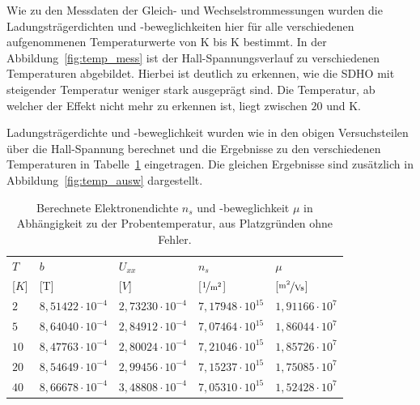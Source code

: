 
Wie zu den Messdaten der Gleich- und Wechselstrommessungen wurden die Ladungsträgerdichten und -beweglichkeiten hier für alle verschiedenen aufgenommenen Temperaturwerte von \unit[2]{K} bis \unit[40]{K} bestimmt. In der Abbildung~\ref{fig:temp_mess} ist der Hall-Spannungsverlauf zu verschiedenen Temperaturen abgebildet. Hierbei ist deutlich zu erkennen, wie die SDHO mit steigender Temperatur weniger stark ausgeprägt sind. Die Temperatur, ab welcher der Effekt nicht mehr zu erkennen ist, liegt zwischen $20$ und \unit[40]{K}.

Ladungsträgerdichte und -beweglichkeit wurden wie in den obigen Versuchsteilen über die Hall-Spannung berechnet und die Ergebnisse zu den verschiedenen Temperaturen in Tabelle~\ref{tab:temp_ausw} eingetragen. Die gleichen Ergebnisse sind zusätzlich in Abbildung~\ref{fig:temp_ausw} dargestellt.

\begin{table}[h]
	\centering
	\begin{tabular}{|l|r|l|r|r|}
		\hline
		\multicolumn{1}{|l|}{\cellcolor{black!30} $T$ } & \multicolumn{1}{|l|}{\cellcolor{black!30} $b$ } & \multicolumn{1}{|l|}{\cellcolor{black!30} $U_{xx}$ } & \multicolumn{1}{|l|}{\cellcolor{black!30} $n_s$ } & \multicolumn{1}{|l|}{\cellcolor{black!30} $\mu$ } \\
		\multicolumn{1}{|l|}{\cellcolor{black!30} [$\unit{K}$] } &  \multicolumn{1}{|l|}{\cellcolor{black!30} [\unit{T}] } &
		\multicolumn{1}{|l|}{\cellcolor{black!30} [$\unit{V}$] } &  \multicolumn{1}{|l|}{\cellcolor{black!30} [$\unitfrac{1}{m^2}$] } & \multicolumn{1}{|l|}{\cellcolor{black!30} [$\unitfrac{m^2}{Vs}$] } \\ \hline
		$ 2 $  & $ 8,51422\cdot 10^{-4} $  & $ 2,73230\cdot 10^{-4} $  & $ 7,17948\cdot 10^{15} $  & $ 1,91166\cdot 10^{7} $  \\ 
		$ 5 $  & $ 8,64040\cdot 10^{-4} $  & $ 2,84912\cdot 10^{-4} $  & $ 7,07464\cdot 10^{15} $  & $ 1,86044\cdot 10^{7} $  \\ 
		$ 10 $  & $ 8,47763\cdot 10^{-4} $  & $ 2,80024\cdot 10^{-4} $  & $ 7,21046\cdot 10^{15} $  & $ 1,85726\cdot 10^{7} $  \\ 
		$ 20 $  & $ 8,54649\cdot 10^{-4} $  & $ 2,99456\cdot 10^{-4} $  & $ 7,15237\cdot 10^{15} $  & $ 1,75085\cdot 10^{7} $  \\ 
		$ 40 $  & $ 8,66678\cdot 10^{-4} $  & $ 3,48808\cdot 10^{-4} $  & $ 7,05310\cdot 10^{15} $  & $ 1,52428\cdot 10^{7} $  \\ \hline
	\end{tabular}
	\caption{Berechnete Elektronendichte $n_s$ und -beweglichkeit $\mu$ in Abhängigkeit zu der Probentemperatur, aus Platzgründen ohne Fehler.}
	\label{tab:temp_ausw}
\end{table}


